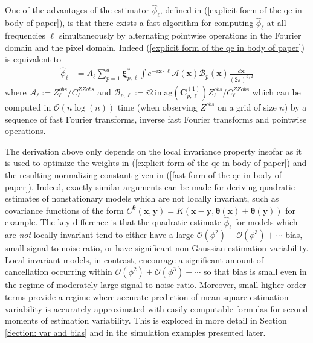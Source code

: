 \documentclass[10pt,noinfoline]{imsart}
\newcommand{\bs}{\boldsymbol}
\begin{document}
One of the advantages of the estimator $\hat\phi_{\bs \ell}$, defined in (\ref{explicit form of the qe in body of paper}), is that there exists a fast algorithm for computing $\hat\phi_{\bs \ell}$ at all frequencies $\bs \ell$ simultaneously by alternating pointwise operations in the Fourier domain and the pixel domain. Indeed (\ref{explicit form of the qe in body of paper}) is equivalent to
\begin{align}
    \label{fast form of the qe in body of paper}
    \hat\phi_{\bs \ell}
    &=   A_{\bs \ell}\sum_{p=1}^d \bs\xi^*_{p,\bs \ell} \int 
        e^{-i\bs x\cdot\bs \ell} \mathscr A(\bs x)\mathscr B_{p}(\bs x)\frac{d\bs x}{{(2\pi)}^{d/2}}
\end{align}
where $\mathscr A_{\bs \ell}:= Z^{obs}_{\bs \ell}/ C^{ZZobs}_{\bs \ell}$ and $\mathscr B_{p,\bs \ell} := i 2  \, \textrm{imag}(\bs C^{(1)}_{p,\bs \ell}) Z^{obs}_{\bs\ell} / C^{ZZobs}_{\bs\ell}$ which  can be computed in $\mathcal O(n\log(n))$ time (when observing $Z^{obs}$ on a grid of size $n$) by a sequence of fast Fourier transforms, inverse fast Fourier transforms and pointwise operations.

The derivation above only depends on the local invariance property insofar as it is used to optimize the weights  in (\ref{explicit form of the qe in body of paper}) and the resulting normalizing constant given in (\ref{fast form of the qe in body of paper}). Indeed, exactly similar arguments can be made for deriving quadratic estimates of nonstationary models which are not locally invariant, such as covariance functions of the form $C^{\bs\theta}(\bs x,\bs y)=K(\bs x-\bs y,\bs\theta(\bs x)+\bs\theta(\bs y))$ for example. The key difference is that the quadratic estimate $\hat \phi_{\bs \ell}$ for models which are {\it not} locally invariant  tend to either have a large  $\mathcal O(\phi^2)+ \mathcal O(\phi^3)+\cdots$ bias,  small signal to noise ratio, or have significant non-Gaussian estimation variability. Local invariant models, in contrast, encourage a significant amount of cancellation occurring within $\mathcal O(\phi^2)+ \mathcal O(\phi^3)+\cdots$ so that bias is small even in the regime of moderately large signal to noise ratio. Moreover, small higher order terms provide a regime where accurate prediction of mean square estimation variability is accurately approximated with easily computable formulas for second moments of estimation variability. This is explored in more detail in Section \ref{Section: var and bias} and in the simulation examples presented later.
\end{document}
